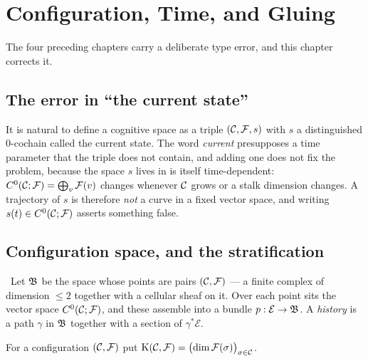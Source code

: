 \chapter{Configuration, Time, and Gluing}\label{ch:config}

The four preceding chapters carry a deliberate type error, and this chapter
corrects it.

\section{The error in ``the current state''}

It is natural to define a cognitive space as a triple $(\mathcal{C},\mathcal{F},s)$ with $s$
a distinguished $0$-cochain called the current state. The word
\emph{current} presupposes a time parameter that the triple does not contain,
and adding one does not fix the problem, because the space $s$ lives in is
itself time-dependent: $C^{0}(\mathcal{C};\mathcal{F})=\bigoplus_v\mathcal{F}(v)$ changes whenever $\mathcal{C}$
grows or a stalk dimension changes. A trajectory of $s$ is therefore
\emph{not} a curve in a fixed vector space, and writing $s(t)\in C^{0}(\mathcal{C};\mathcal{F})$
asserts something false.

\section{Configuration space, and the stratification}\label{sec:stratconf}

\begin{construction}\label{con:config}
\Proposed\ Let $\mathfrak{B}$ be the space whose points are pairs $(\mathcal{C},\mathcal{F})$ ---
a finite complex of dimension $\le2$ together with a cellular sheaf on it.
Over each point sits the vector space $C^{0}(\mathcal{C};\mathcal{F})$, and these assemble into a
bundle $p:\mathcal{E}\to\mathfrak{B}$. A \emph{history} is a path $\gamma$ in
$\mathfrak{B}$ together with a section of $\gamma^*\mathcal{E}$.
\end{construction}

\begin{definition}\label{def:Kinv}
For a configuration $(\mathcal{C},\mathcal{F})$ put
$\mathrm{K}(\mathcal{C},\mathcal{F})=\bigl(\dim\mathcal{F}(\sigma)\bigr)_{\sigma\in\mathcal{C}}$.
\end{definition}

